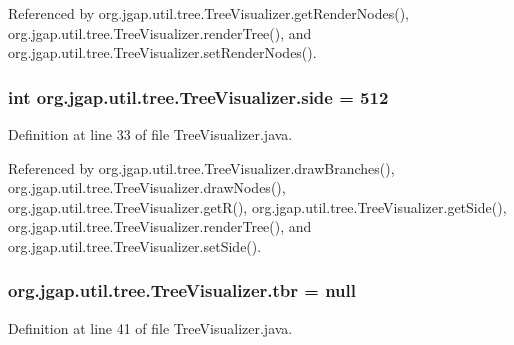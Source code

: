 Referenced by org.\-jgap.\-util.\-tree.\-Tree\-Visualizer.\-get\-Render\-Nodes(), org.\-jgap.\-util.\-tree.\-Tree\-Visualizer.\-render\-Tree(), and org.\-jgap.\-util.\-tree.\-Tree\-Visualizer.\-set\-Render\-Nodes().

\hypertarget{classorg_1_1jgap_1_1util_1_1tree_1_1_tree_visualizer_a781fb40c6010a7b7da02446826b1d92a}{
\subsubsection[{side}]{\setlength{\rightskip}{0pt plus 5cm}int org.\-jgap.\-util.\-tree.\-Tree\-Visualizer.\-side = 512\hspace{0.3cm}{\ttfamily [private]}}}\label{classorg_1_1jgap_1_1util_1_1tree_1_1_tree_visualizer_a781fb40c6010a7b7da02446826b1d92a}


Definition at line 33 of file Tree\-Visualizer.\-java.



Referenced by org.\-jgap.\-util.\-tree.\-Tree\-Visualizer.\-draw\-Branches(), org.\-jgap.\-util.\-tree.\-Tree\-Visualizer.\-draw\-Nodes(), org.\-jgap.\-util.\-tree.\-Tree\-Visualizer.\-get\-R(), org.\-jgap.\-util.\-tree.\-Tree\-Visualizer.\-get\-Side(), org.\-jgap.\-util.\-tree.\-Tree\-Visualizer.\-render\-Tree(), and org.\-jgap.\-util.\-tree.\-Tree\-Visualizer.\-set\-Side().

\hypertarget{classorg_1_1jgap_1_1util_1_1tree_1_1_tree_visualizer_a3df4f6da758083da9c844f0f46d81b31}{
\subsubsection[{tbr}]{ org.\-jgap.\-util.\-tree.\-Tree\-Visualizer.\-tbr = null\hspace{0.3cm}{\ttfamily [private]}}}\label{classorg_1_1jgap_1_1util_1_1tree_1_1_tree_visualizer_a3df4f6da758083da9c844f0f46d81b31}


Definition at line 41 of file Tree\-Visualizer.\-java.




